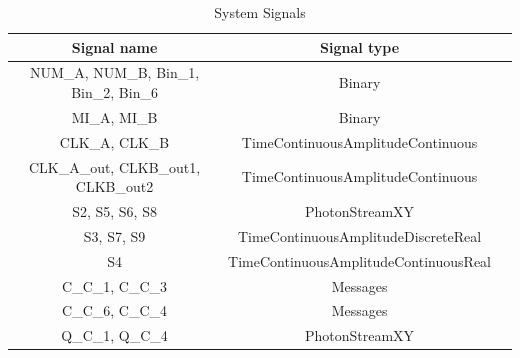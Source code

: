 \begin{refsection}
%
%

\begin{table}[H]
\centering
\caption{System Signals}
\label{tb:signals}
\begin{tabular}{|c|c|c|}
\hline
\textbf{Signal name}                        & \textbf{Signal type}                      \\ \hline
NUM\_A, NUM\_B, Bin\_1, Bin\_2, Bin\_6      &  Binary                                   \\ \hline
MI\_A, MI\_B                                &  Binary                                   \\ \hline
CLK\_A, CLK\_B                              &  TimeContinuousAmplitudeContinuous        \\ \hline
CLK\_A\_out, CLKB\_out1, CLKB\_out2         &  TimeContinuousAmplitudeContinuous        \\ \hline
S2, S5, S6, S8                              &  PhotonStreamXY                           \\ \hline
S3, S7, S9                                  &  TimeContinuousAmplitudeDiscreteReal      \\ \hline
S4                                          &  TimeContinuousAmplitudeContinuousReal      \\ \hline
C\_C\_1, C\_C\_3                            &  Messages                                 \\ \hline
C\_C\_6, C\_C\_4                            &  Messages                                 \\ \hline
Q\_C\_1, Q\_C\_4                            &  PhotonStreamXY                           \\ \hline


\end{tabular}
\end{table}
\end{refsection}
